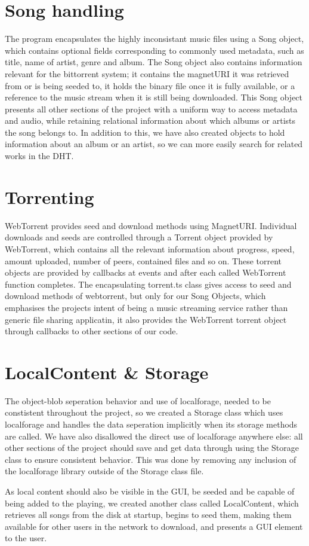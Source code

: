 \section{Song handling}
The program encapsulates the highly inconsistant music files using a Song object,
which contains optional fields corresponding to commonly used metadata, 
such as title, name of artist, genre and album. 
The Song object also contains information relevant for the bittorrent system; 
it contains the magnetURI it was retrieved from or is being seeded to, 
it holds the binary file once it is fully available, 
or a reference to the music stream when it is still being downloaded.
This Song object presents all other sections of the project with a uniform way to access metadata and audio, 
while retaining relational information about which albums or artists the song belongs to. In addition to this, 
we have also created objects to hold information about an album or an artist, 
so we can more easily search for related works in the DHT.
\newline

\section{Torrenting}
WebTorrent provides seed and download methods using MagnetURI.
Individual downloads and seeds are controlled through a Torrent object provided by WebTorrent,
which contains all the relevant information about progress, 
speed, amount uploaded, number of peers, contained files and so on.
These torrent objects are provided by callbacks at events
and after each called WebTorrent function completes.
The encapsulating torrent.ts class gives access to seed and download methods of webtorrent, 
but only for our Song Objects, which emphasises the projects intent of being a music streaming service 
rather than generic file sharing applicatin, 
it also provides the WebTorrent torrent object through callbacks to other sections of our code.
\newline

\section{LocalContent \& Storage}
The object-blob seperation behavior and use of localforage,
needed to be constistent throughout the project, 
so we created a Storage class which uses localforage and handles the data seperation implicitly when its storage methods are called.
We have also disallowed the direct use of localforage anywhere else:
all other sections of the project should save and get data through using the Storage class to ensure consistent behavior. 
This was done by removing any inclusion of the localforage library outside of the Storage class file.

As local content should also be visible in the GUI, 
be seeded and be capable of being added to the playing,
we created another class called LocalContent,
which retrieves all songs from the disk at startup,
begins to seed them, making them available for other users in the network to download,
and presents a GUI element to the user.
